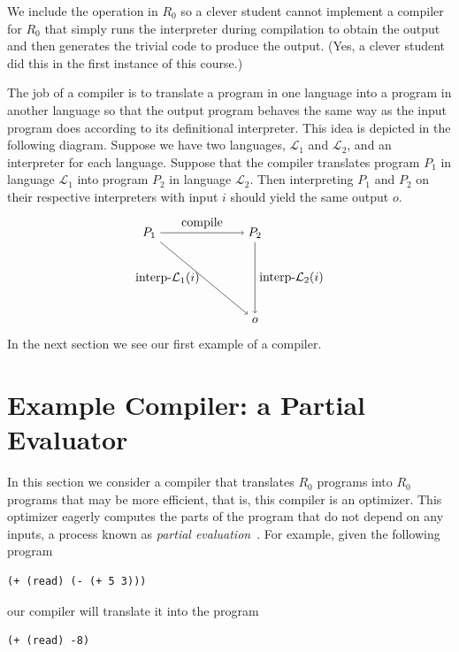 \documentclass[11pt]{book}
\begin{document}
We include the  operation in $R_0$ so a clever student
cannot implement a compiler for $R_0$ that simply runs the interpreter
during compilation to obtain the output and then generates the trivial
code to produce the output. (Yes, a clever student did this in the
first instance of this course.)

The job of a compiler is to translate a program in one language into a
program in another language so that the output program behaves the
same way as the input program does according to its definitional
interpreter. This idea is depicted in the following diagram. Suppose
we have two languages, $\mathcal{L}_1$ and $\mathcal{L}_2$, and an
interpreter for each language.  Suppose that the compiler translates
program $P_1$ in language $\mathcal{L}_1$ into program $P_2$ in
language $\mathcal{L}_2$.  Then interpreting $P_1$ and $P_2$ on their
respective interpreters with input $i$ should yield the same output
$o$.
\begin{equation} \label{eq:compile-correct}
\begin{tikzpicture}[baseline=(current  bounding  box.center)]
 \node (p1) at (0,  0) {$P_1$};
 \node (p2) at (3,  0) {$P_2$};
 \node (o)  at (3, -2.5) {$o$};

 \path[->] (p1) edge [above] node {compile} (p2);
 \path[->] (p2) edge [right] node {interp-$\mathcal{L}_2$($i$)} (o);
 \path[->] (p1) edge [left]  node {interp-$\mathcal{L}_1$($i$)} (o);
\end{tikzpicture}
\end{equation}
In the next section we see our first example of a compiler.


\section{Example Compiler: a Partial Evaluator}
\label{sec:partial-evaluation}

In this section we consider a compiler that translates $R_0$ programs
into $R_0$ programs that may be more efficient, that is, this compiler
is an optimizer. This optimizer eagerly computes the parts of the
program that do not depend on any inputs, a process known as
\emph{partial evaluation}~\cite{Jones:1993uq}.
For example, given the following program
\begin{lstlisting}
(+ (read) (- (+ 5 3)))
\end{lstlisting}
our compiler will translate it into the program
\begin{lstlisting}
(+ (read) -8)
\end{lstlisting}
\end{document}
